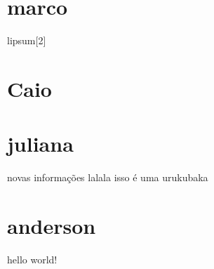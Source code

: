 
    \section{marco}
    lipsum[2]
    \section{Caio}
    \section{juliana}
    novas informações
    lalala
    isso é uma urukubaka




    
    \section{anderson}
     hello world!









